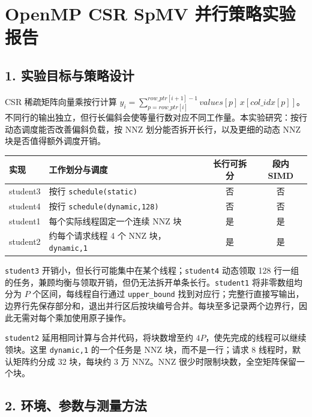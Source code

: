 \documentclass[
  10pt,
  a4paper,
]{article}
\author{}
\date{}
\begin{document}
\section{OpenMP CSR SpMV
并行策略实验报告}\label{openmp-csr-spmv-ux5e76ux884cux7b56ux7565ux5b9eux9a8cux62a5ux544a}

\subsection{1.
实验目标与策略设计}\label{ux5b9eux9a8cux76eeux6807ux4e0eux7b56ux7565ux8bbeux8ba1}

CSR 稀疏矩阵向量乘按行计算
\(y_i=\sum_{p=row\_ptr[i]}^{row\_ptr[i+1]-1}values[p]\,x[col\_idx[p]]\)。不同行的输出独立，但行长偏斜会使等量行数对应不同工作量。本实验研究：按行动态调度能否改善偏斜负载，按
NNZ 划分能否拆开长行，以及更细的动态 NNZ 块是否值得额外调度开销。

\begin{longtable}[]{@{}llcc@{}}
\toprule\noalign{}
实现 & 工作划分与调度 & 长行可拆分 & 段内 SIMD \\
\midrule\noalign{}
\endhead
\bottomrule\noalign{}
\endlastfoot
student3 & 按行 \texttt{schedule(static)} & 否 & 否 \\
student4 & 按行 \texttt{schedule(dynamic,128)} & 否 & 否 \\
student1 & 每个实际线程固定一个连续 NNZ 块 & 是 & 是 \\
student2 & 约每个请求线程 4 个 NNZ 块，\texttt{dynamic,1} & 是 & 是 \\
\end{longtable}

\texttt{student3} 开销小，但长行可能集中在某个线程；\texttt{student4}
动态领取 128
行一组的任务，兼顾均衡与领取开销，但仍无法拆开单条长行。\texttt{student1}
将非零数组均分为 \(P\) 个区间，每线程自行通过 \texttt{upper\_bound}
找到对应行；完整行直接写输出，边界行先保存部分和，退出并行区后按块编号合并。每块至多记录两个边界行，因此无需对每个乘加使用原子操作。

\texttt{student2} 延用相同计算与合并代码，将块数增至约
\(4P\)，使先完成的线程可以继续领块。这里 \texttt{dynamic,1} 的一个任务是
NNZ 块，而不是一行；请求 8 线程时，默认矩阵约分成 32 块，每块约 3 万
NNZ。NNZ 很少时限制块数，全空矩阵保留一个块。

\subsection{2.
环境、参数与测量方法}\label{ux73afux5883ux53c2ux6570ux4e0eux6d4bux91cfux65b9ux6cd5}
\end{document}

